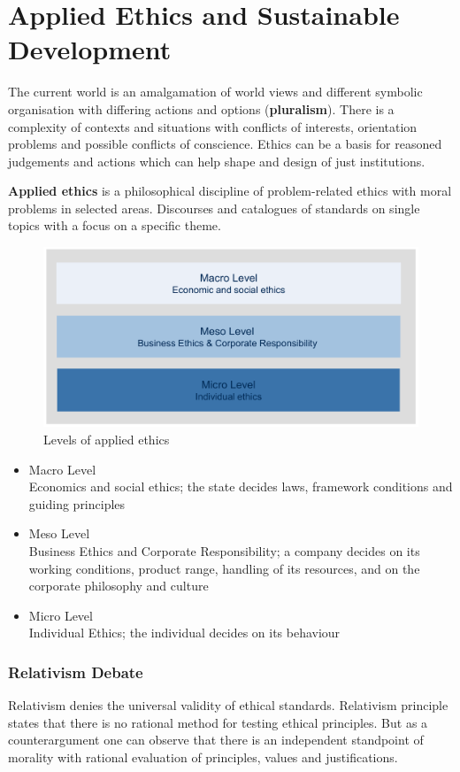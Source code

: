 \documentclass[11pt]{article}
\theoremstyle{definition}
\begin{document}
\section{Applied Ethics and Sustainable Development}
The current world is an amalgamation of world views and different symbolic organisation with differing actions and options (\textbf{pluralism}). There is a complexity of contexts and situations with conflicts of interests, orientation problems and possible conflicts of conscience. Ethics can be a basis for reasoned judgements and actions which can help shape and design of just institutions.

\begin{definition}
	\textbf{Applied ethics} is a philosophical discipline of problem-related ethics with moral problems in selected areas. Discourses and catalogues of standards on single topics with a focus on a specific theme.
\end{definition}

\begin{figure}[tbh]
	\centering
	\includegraphics[width=0.6\linewidth]{img/applied_ethics_level}
	\caption{Levels of applied ethics}
	\label{fig:appliedethicslevel}
\end{figure}

\begin{itemize}
	\item Macro Level\\Economics and social ethics; the state decides laws, framework conditions and guiding principles
	\item Meso Level\\Business Ethics and Corporate Responsibility; a company decides on its working conditions, product range, handling of its resources, and on the corporate philosophy and culture
	\item Micro Level\\Individual Ethics; the individual decides on its behaviour
\end{itemize}

\subsubsection{Relativism Debate}
Relativism denies the universal validity of ethical standards. Relativism principle states that there is no rational method for testing ethical principles. But as a counterargument one can observe that there is an independent standpoint of morality with rational evaluation of principles, values and justifications.
\end{document}
